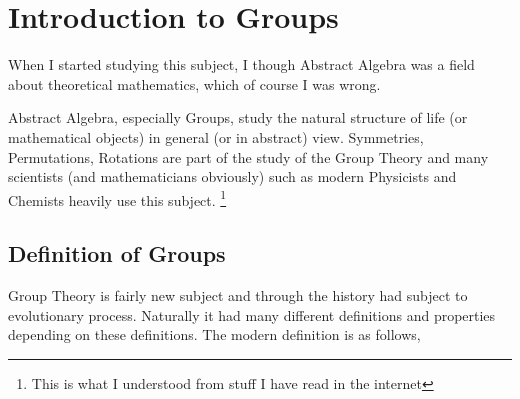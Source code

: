 \chapter{Introduction to Groups}
When I started studying this subject, I though Abstract Algebra was a field about theoretical mathematics, which of course I was wrong.

Abstract Algebra, especially Groups, study the natural structure of life (or mathematical objects) in general (or in abstract) view.
Symmetries, Permutations, Rotations are part of the study of the Group Theory and many scientists (and mathematicians obviously) such as
modern Physicists and Chemists heavily use this subject.
\footnote{This is what I understood from stuff I have read in the internet}
\section{Definition of Groups}
Group Theory is fairly new subject and through the history had subject to evolutionary process. Naturally it had many different definitions
and properties depending on these definitions. The modern definition is as follows,

